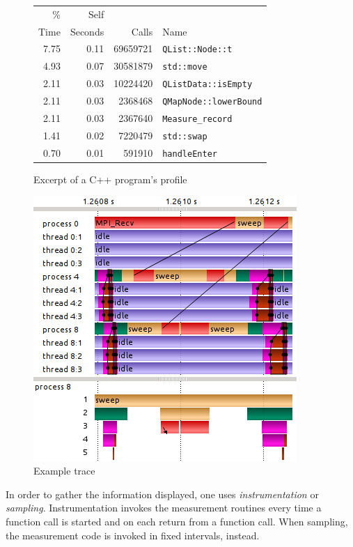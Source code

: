 \documentclass[b5paper, final, hauptseminar]{zih-template}
\begin{document}
\begin{figure}[htbp]
	\centering
	\caption{Excerpt of a C++ program's profile}
	\vspace{0.2cm}
	\begin{tabular}{r r r | l}
		\%   & Self    &          &                               \\
		Time & Seconds & Calls    & Name                          \\
		\hline
		7.75 & 0.11    & 69659721 & \texttt{QList::Node::t}       \\
		4.93 & 0.07    & 30581879 & \texttt{std::move}            \\
		2.11 & 0.03    & 10224420 & \texttt{QListData::isEmpty}   \\
		2.11 & 0.03    &  2368468 & \texttt{QMapNode::lowerBound} \\
		2.11 & 0.03    &  2367640 & \texttt{Measure\_record}      \\
		1.41 & 0.02    &  7220479 & \texttt{std::swap}            \\
		0.70 & 0.01    &   591910 & \texttt{handleEnter}          \\
	\end{tabular}
	\label{fig:bg-meas-profile}
\end{figure}

\begin{figure}[htbp]
	\centering
	\includegraphics[width=0.5\linewidth]{bg-meas-trace}
	\caption{Example trace}
	\label{fig:bg-meas-trace}
\end{figure}

In order to gather the information displayed, one uses \emph{instrumentation} or \emph{sampling}.
Instrumentation invokes the measurement routines every time a function call is started and on each return from a function call.
When sampling, the measurement code is invoked in fixed intervals, instead.
\end{document}
